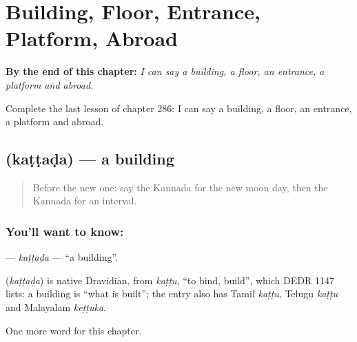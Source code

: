 
\chapter{Building, Floor, Entrance, Platform, Abroad}
\label{ch:ka-building-floor-entrance-platform-abroad}

\begin{chapteropening}
\textbf{By the end of this chapter:} \emph{I can say a building, a floor, an entrance, a platform and abroad.}

Complete the last lesson of chapter 286: I can say a building, a floor, an entrance, a platform and abroad.
\end{chapteropening}

\section[\texorpdfstring{\kn{ಕಟ್ಟಡ} (kaṭṭaḍa)}{ಕಟ್ಟಡ (kaṭṭaḍa)}]{ (kaṭṭaḍa) — a building}

\label{lesson:KA-C286-kattada}



\begin{quote}
Before the new one: say the Kannada for the new moon day, then the Kannada for an interval.
\end{quote}

\subsection*{You'll want to know: }
\textbf{} — \emph{kaṭṭaḍa} — \textquotedblleft{}a building\textquotedblright{}.

\begin{cousinweb}
\textbf{} (\emph{kaṭṭaḍa}) is native Dravidian, from \emph{kaṭṭu}, \textquotedblleft{}to bind, build\textquotedblright{}, which DEDR 1147 lists: a building is \textquotedblleft{}what is built\textquotedblright{}; the entry also has Tamil \emph{kaṭṭu}, Telugu \emph{kaṭṭu} and Malayalam \emph{keṭṭuka}.
\end{cousinweb}

\begin{grammarlens}[title={What you've built}]
One more word for this chapter.
\end{grammarlens}

